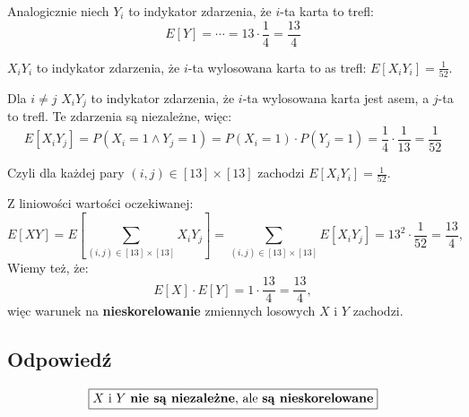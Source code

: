 Analogicznie niech \(Y_i\) to indykator zdarzenia, że \(i\)-ta karta to trefl:
\[
	E[Y] = \cdots = 13 \cdot \frac{1}{4} = \frac{13}{4}
\]


\(X_iY_i\) to indykator zdarzenia, że \(i\)-ta wylosowana karta to as trefl:
\(E[X_iY_i] = \frac{1}{52}\).

Dla \(i \neq j\) \(X_iY_j\) to indykator zdarzenia, że \(i\)-ta wylosowana karta
jest asem, a \(j\)-ta to trefl. Te zdarzenia są niezależne, więc:
\[
	E[X_iY_j] = P(X_i = 1 \land Y_j = 1)
	= P(X_i = 1) \cdot P(Y_j = 1)
	= \frac{1}{4} \cdot \frac{1}{13} = \frac{1}{52}
\]

Czyli dla każdej pary \((i, j) \in [13] \times [13]\) zachodzi \(E[X_iY_i] = \frac{1}{52}\).

Z liniowości wartości oczekiwanej:
\[
	E[XY]
	= E\left[ \sum_{(i,j) \in [13] \times [13]} X_iY_j \right]
	= \sum_{(i,j) \in [13] \times [13]} E[X_iY_j]
	= 13^2 \cdot \frac{1}{52}
	= \frac{13}{4},
\]
Wiemy też, że:
\[
	E[X] \cdot E[Y] = 1 \cdot \frac{13}{4} = \frac{13}{4},
\]
więc warunek na \textbf{nieskorelowanie} zmiennych losowych \(X\) i \(Y\) zachodzi.

\subsection*{Odpowiedź}
\[
	\boxed{\text{\(X\) i \(Y\) \textbf{nie są niezależne}, ale \textbf{są nieskorelowane}}}
\]
